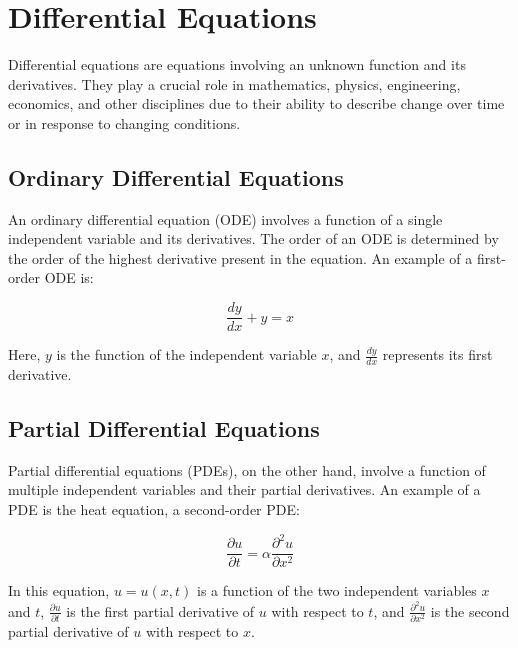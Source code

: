 \chapter{Differential Equations}

Differential equations are equations involving an unknown function and
its derivatives. They play a crucial role in mathematics, physics,
engineering, economics, and other disciplines due to their ability to
describe change over time or in response to changing conditions.

\section{Ordinary Differential Equations}

An ordinary differential equation (ODE) involves a function of a
single independent variable and its derivatives. The order of an ODE
is determined by the order of the highest derivative present in the
equation. An example of a first-order ODE is: 

\begin{equation}
\frac{dy}{dx} + y = x
\end{equation}

Here, $y$ is the function of the independent variable $x$, and $\frac{dy}{dx}$ represents its first derivative.

\section{Partial Differential Equations}

Partial differential equations (PDEs), on the other hand, involve a
function of multiple independent variables and their partial
derivatives. An example of a PDE is the heat equation, a second-order
PDE: 

\begin{equation}
\frac{\partial u}{\partial t} = \alpha \frac{\partial^2 u}{\partial x^2}
\end{equation}

In this equation, $u = u(x, t)$ is a function of the two independent
variables $x$ and $t$, $\frac{\partial u}{\partial t}$ is the first
partial derivative of $u$ with respect to $t$, and $\frac{\partial^2
  u}{\partial x^2}$ is the second partial derivative of $u$ with
respect to $x$.


